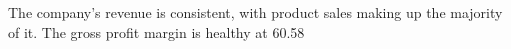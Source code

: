 

The company's revenue is consistent, with product sales making up the majority of it. The gross profit margin is healthy at 60.58%